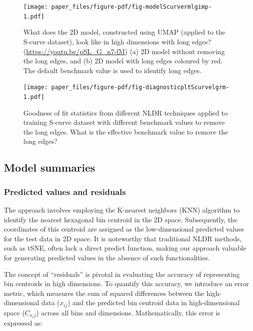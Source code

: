 \documentclass[
  12pt]{article}
\begin{document}
\begin{figure}

{\centering \texttt{[image: paper\_files/figure-pdf/fig-modelScurvermlgimp-1.pdf]}

}

\caption{\label{fig-modelScurvermlgimp}What does the 2D model,
constructed using UMAP (applied to the S-curve dataset), look like in
high dimensions with long edges? (\url{https://youtu.be/pSL_G_n7-fM})
(a) 2D model without removing the long edges, and (b) 2D model with long
edges coloured by red. The default benchmark value is used to identify
long edges.}

\end{figure}

\begin{figure}

{\centering \texttt{[image: paper\_files/figure-pdf/fig-diagnosticpltScurvelgrm-1.pdf]}

}

\caption{\label{fig-diagnosticpltScurvelgrm}Goodness of fit statistics
from different NLDR techniques applied to training S-curve dataset with
different benchmark values to remove the long edges. What is the
effective benchmark value to remove the long edges?}

\end{figure}

\hypertarget{sec-summary}{%
\subsection{Model summaries}\label{sec-summary}}

\hypertarget{predicted-values-and-residuals}{%
\subsubsection{Predicted values and
residuals}\label{predicted-values-and-residuals}}

The approach involves employing the K-nearest neighbors (KNN) algorithm
to identify the nearest hexagonal bin centroid in the 2D space.
Subsequently, the coordinates of this centroid are assigned as the
low-dimensional predicted values for the test data in 2D space. It is
noteworthy that traditional NLDR methods, such as tSNE, often lack a
direct predict function, making our approach valuable for generating
predicted values in the absence of such functionalities.

The concept of ``residuals'' is pivotal in evaluating the accuracy of
representing bin centroids in high dimensions. To quantify this
accuracy, we introduce an error metric, which measures the sum of
squared differences between the high-dimensional data (\(x_{ij}\)) and
the predicted bin centroid data in high-dimensional space (\(C_{x_ij}\))
across all bins and dimensions. Mathematically, this error is expressed
as:
\end{document}
